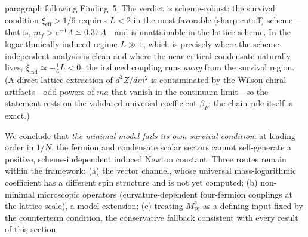 \documentclass[11pt,a4paper]{article}
\begin{document}
paragraph following Finding~5.
The verdict is scheme-robust: the survival condition
$\xi_{\mathrm{eff}} > 1/6$ requires $L < 2$ in the most favorable
(sharp-cutoff) scheme---that is, $m_f > e^{-1}\Lambda \simeq
0.37\,\Lambda$---and is unattainable in the lattice scheme.
In the logarithmically induced regime $L \gg 1$, which is precisely
where the scheme-independent analysis is clean and where the
near-critical condensate naturally lives,
$\xi_{\mathrm{ind}} \simeq -\tfrac{1}{6}L < 0$: the induced
coupling runs \emph{away} from the survival region.
(A direct lattice extraction of $d^2Z/dm^2$ is contaminated by the
Wilson chiral artifacts---odd powers of $ma$ that vanish in the
continuum limit---so the statement rests on the validated universal
coefficient $\beta_F$; the chain rule itself is exact.)

We conclude that \emph{the minimal model fails its own survival
condition}: at leading order in $1/N$, the fermion and condensate
scalar sectors cannot self-generate a positive, scheme-independent
induced Newton constant.
Three routes remain within the framework:
(a) the vector channel, whose universal mass-logarithmic
coefficient has a different spin structure and is not yet computed;
(b) non-minimal microscopic operators (curvature-dependent
four-fermion couplings at the lattice scale), a model extension;
(c) treating $M_{\mathrm{Pl}}^2$ as a defining input fixed by the
counterterm condition, the conservative fallback consistent with
every result of this section.
\end{document}
